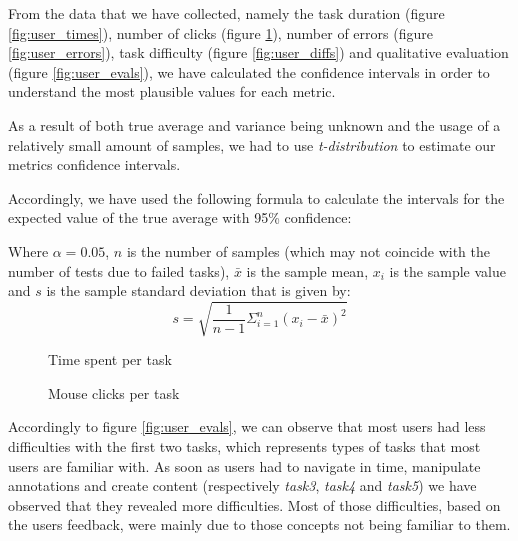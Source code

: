 From the data that we have collected, namely the task duration (figure \ref{fig:user_times}), number of clicks (figure \ref{fig:user_clicks}), number of errors (figure \ref{fig:user_errors}), task difficulty (figure \ref{fig:user_diffs}) and qualitative evaluation (figure \ref{fig:user_evals}), we have calculated the confidence intervals in order to understand the most plausible values for each metric.

As a result of both true average and variance being unknown and the usage of a relatively small amount of samples, we had to use \emph{t-distribution} to estimate our metrics confidence intervals. 

Accordingly, we have used the following formula to calculate the intervals for the expected value of the true average with 95\% confidence:
\begin{equation}
[\bar{x}-F^{-1}_{t_{(n-1)}}(1-\alpha/2)\times \frac{s}{\sqrt{n}}, \bar{x}+F^{-1}_{t_{(n-1)}}(1-\alpha/2)\times \frac{s}{\sqrt{n}}]
\end{equation}

Where $\alpha=0.05$, $n$ is the number of samples (which may not coincide with the number of tests due to failed tasks), $\bar{x}$ is the sample mean, $x_i$ is the sample value and $s$ is the sample standard deviation that is given by:
\begin{equation}
s=\sqrt{\frac{1}{n-1}\Sigma^{n}_{i=1}(x_i-\bar{x})^2}
\end{equation}

\begin{figure}[!htb]
\centering
\begin{minipage}[b]{0.45\linewidth}
  \begin{center}
    
  \end{center}
  \caption{Time spent per task}
  \label{fig:user_times}
\end{minipage}
\begin{minipage}[b]{0.45\linewidth}
   \begin{center}
    
  \end{center}
  \caption{Mouse clicks per task}
  \label{fig:user_clicks}
\end{minipage}
\end{figure}


Accordingly to figure \ref{fig:user_evals}, we can observe that most users had less difficulties with the first two tasks, which represents types of tasks that most users are familiar with. As soon as users had to navigate in time, manipulate annotations and create content (respectively \emph{task3}, \emph{task4} and \emph{task5}) we have observed that they revealed more difficulties. Most of those difficulties, based on the users feedback, were mainly due to those concepts not being familiar to them.


